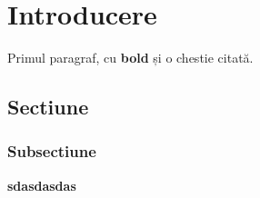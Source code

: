 \chapter{Introducere}

Primul paragraf, cu \textbf{bold} și o chestie citată.\cite{hoare_csp}

\section{Sectiune}
\subsection{Subsectiune}

\textbf{sdasdasdas}